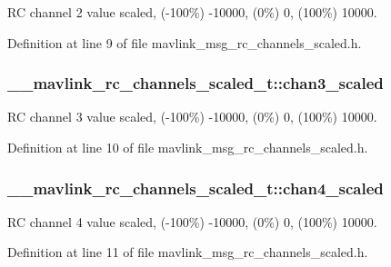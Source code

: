 R\-C channel 2 value scaled, (-\/100\%) -\/10000, (0\%) 0, (100\%) 10000. 



Definition at line 9 of file mavlink\-\_\-msg\-\_\-rc\-\_\-channels\-\_\-scaled.\-h.

\hypertarget{struct____mavlink__rc__channels__scaled__t_a1f6f236dabbe2174233f2bf4e16f3c7d}{
\subsubsection[{chan3\-\_\-scaled}]{ \-\_\-\-\_\-mavlink\-\_\-rc\-\_\-channels\-\_\-scaled\-\_\-t\-::chan3\-\_\-scaled}}\label{struct____mavlink__rc__channels__scaled__t_a1f6f236dabbe2174233f2bf4e16f3c7d}


R\-C channel 3 value scaled, (-\/100\%) -\/10000, (0\%) 0, (100\%) 10000. 



Definition at line 10 of file mavlink\-\_\-msg\-\_\-rc\-\_\-channels\-\_\-scaled.\-h.

\hypertarget{struct____mavlink__rc__channels__scaled__t_a707b8ff01d82e1ddb4aa440c60265315}{
\subsubsection[{chan4\-\_\-scaled}]{ \-\_\-\-\_\-mavlink\-\_\-rc\-\_\-channels\-\_\-scaled\-\_\-t\-::chan4\-\_\-scaled}}\label{struct____mavlink__rc__channels__scaled__t_a707b8ff01d82e1ddb4aa440c60265315}


R\-C channel 4 value scaled, (-\/100\%) -\/10000, (0\%) 0, (100\%) 10000. 



Definition at line 11 of file mavlink\-\_\-msg\-\_\-rc\-\_\-channels\-\_\-scaled.\-h.

